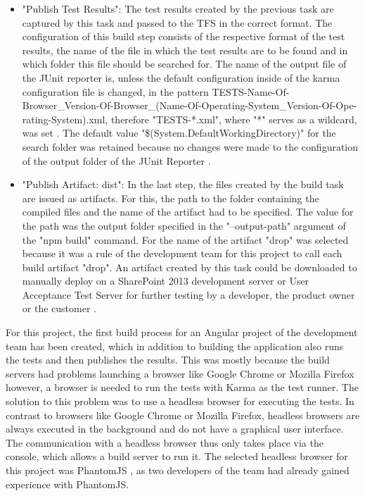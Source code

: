 \documentclass[Bachelor,BIF,english]{twbook}
\begin{document}
\begin{itemize}
\item "Publish Test Results": The test results created by the previous task are captured by this task and passed to the TFS in the correct format. The configuration of this build step consists of the respective format of the test results, the name of the file in which the test results are to be found and in which folder this file should be searched for. The name of the output file of the JUnit reporter is, unless the default configuration inside of the karma configuration file is changed, in the pattern TESTS-Name-Of-Browser{\_}Version-Of-Browser{\_}(Name-Of-Operating-System{\_}Version-Of-Ope-\\rating-System).xml, therefore "TESTS-*.xml", where "*" serves as a wildcard, was set \cite{KarmaJUnitReporterConfig}. The default value "\$(System.DefaultWorkingDirectory)" for the search folder was retained because no changes were made to the configuration of the output folder of the JUnit Reporter \cite{TFSPublishBuildArtifact}.
\item "Publish Artifact: dist": In the last step, the files created by the build task are issued as artifacts. For this, the path to the folder containing the compiled files and the name of the artifact had to be specified. The value for the path was the output folder specified in the "--output-path" argument of the "npm build" command. For the name of the artifact "drop" was selected because it was a rule of the development team for this project to call each build artifact "drop". An artifact created by this task could be downloaded to manually deploy on a SharePoint 2013 development server or User Acceptance Test Server for further testing by a developer, the product owner or the customer \cite{TFSPublishBuildArtifact}.
\end{itemize}
For this project, the first build process for an Angular project of the development team has been created, which in addition to building the application also runs the tests and then publishes the results. This was mostly because the build servers had problems launching a browser like Google Chrome \cite{Chrome} or Mozilla Firefox \cite{Firefox} however, a browser is needed to run the tests with Karma as the test runner. The solution to this problem was to use a headless browser \cite[p.~2]{HeadlessBrowser} for executing the tests. In contrast to browsers like Google Chrome or Mozilla Firefox, headless browsers are always executed in the background and do not have a graphical user interface. The communication with a headless browser thus only takes place via the console, which allows a build server to run it. The selected headless browser for this project was PhantomJS \cite{PhantomJS}, as two developers of the team had already gained experience with PhantomJS.
\end{document}
